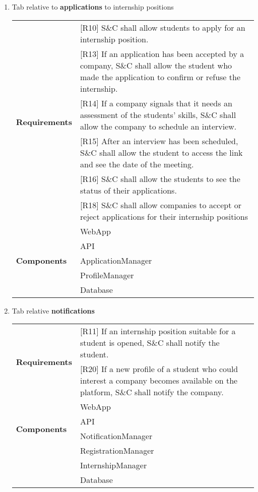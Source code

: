 \begin{enumerate}
    \newpage
    \item Tab relative to \textbf{applications} to internship positions
    \begin{center}
        \begin{tabular}{ |p{4cm}|p{10cm}| } 
        \hline
        \multirow{6}{6em}{\textbf{Requirements}} 
        & [R10] S\&C shall allow students to apply for an internship position. \\
        & [R13]  If an application has been accepted by a company, S\&C shall allow the student who made the application to confirm or refuse the internship. \\
        & [R14] If a company signals that it needs an assessment of the students’ skills, S\&C shall allow the company to schedule an interview. \\
        & [R15] After an interview has been scheduled, S\&C shall allow the student to access the link and see the date of the meeting. \\
        & [R16] S\&C shall allow the students to see the status of their applications. \\
        & [R18] S\&C shall allow companies to accept or reject applications for their internship positions \\
        \hline
        \multirow{5}{6em}{\textbf{Components}} 
        & WebApp \\ 
        & API \\ 
        & ApplicationManager \\ 
        & ProfileManager \\
        & Database \\
        \hline
        \end{tabular}
    \end{center}
    
    \item Tab relative \textbf{notifications}
    \begin{center}
        \begin{tabular}{ |p{4cm}|p{10cm}| } 
        \hline
        \multirow{2}{6em}{\textbf{Requirements}} 
        & [R11] If an internship position suitable for a student is opened, S\&C shall notify the student. \\
        & [R20]  If a new profile of a student who could interest a company becomes available on the platform, S\&C
        shall notify the company. \\
        \hline
        \multirow{4}{6em}{\textbf{Components}} 
        & WebApp \\ 
        & API \\ 
        & NotificationManager \\ 
        & RegistrationManager \\
        & InternshipManager \\
        & Database \\
        \hline
        \end{tabular}
    \end{center}
    

\end{enumerate}
